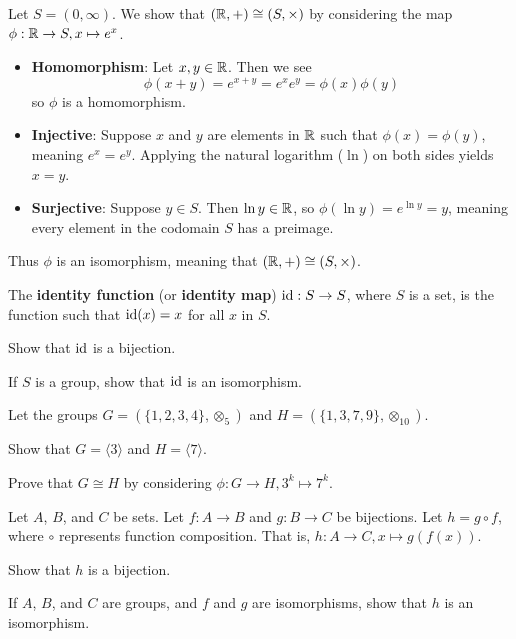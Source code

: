 \begin{example}
    Let $S = (0,\infty)$. We show that $(\mathbb{R}, +) \cong (S, \times)$ by considering the map $\phi: \mathbb{R} \to S, x \mapsto e^x$.
    \begin{itemize}
        \item \textbf{Homomorphism}: Let $x, y \in \mathbb{R}$. Then we see
        \[
            \phi(x+y) = e^{x+y} = e^xe^y = \phi(x)\phi(y)
        \]
        so $\phi$ is a homomorphism.

        \item \textbf{Injective}: Suppose $x$ and $y$ are elements in $\mathbb{R}$ such that $\phi(x) = \phi(y)$, meaning $e^x = e^y$. Applying the natural logarithm ($\ln$) on both sides yields $x = y$.

        \item \textbf{Surjective}: Suppose $y \in S$. Then $\ln y \in \mathbb{R}$, so $\phi(\ln y) = e^{\ln y} = y$, meaning every element in the codomain $S$ has a preimage.
    \end{itemize}

    Thus $\phi$ is an isomorphism, meaning that $(\mathbb{R}, +) \cong (S, \times)$.
\end{example}

\begin{exercise}\label{exercise-identity-map-is-isomorphism}
    The \textbf{identity function} (or \textbf{identity map}) $\mathrm{id}: S \to S$, where $S$ is a set, is the function such that $\mathrm{id}(x) = x$ for all $x$ in $S$.
    \begin{partquestions}{\roman*}
        \item Show that $\mathrm{id}$ is a bijection.
        \item If $S$ is a group, show that $\mathrm{id}$ is an isomorphism.
    \end{partquestions}
\end{exercise}
\begin{exercise}
    Let the groups $G = (\{1, 2, 3, 4\}, \otimes_5)$ and $H = (\{1, 3, 7, 9\}, \otimes_{10})$.
    \begin{partquestions}{\roman*}
        \item Show that $G = \langle 3 \rangle$ and $H = \langle 7 \rangle$.
        \item Prove that $G \cong H$ by considering $\phi: G \to H, 3^k \mapsto 7^k$.
    \end{partquestions}
\end{exercise}
\begin{exercise}\label{exercise-composition-of-isomorphisms-is-isomorphisms}
    Let $A$, $B$, and $C$ be sets. Let $f: A \to B$ and $g: B \to C$ be bijections. Let $h = g\circ f$, where $\circ$ represents function composition. That is, $h: A \to C, x \mapsto g(f(x))$.
    \begin{partquestions}{\roman*}
        \item Show that $h$ is a bijection.
        \item If $A$, $B$, and $C$ are groups, and $f$ and $g$ are isomorphisms, show that $h$ is an isomorphism.
    \end{partquestions}
\end{exercise}

